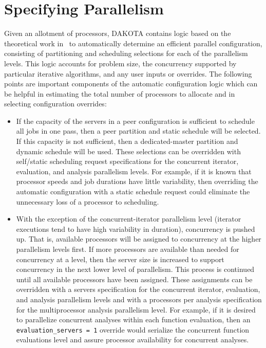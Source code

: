 \section{Specifying Parallelism}\label{parallel:spec}

Given an allotment of processors, DAKOTA contains logic based on the
theoretical work in~\cite{Eld00} to automatically determine an efficient
parallel configuration, consisting of partitioning and scheduling
selections for each of the parallelism levels. This logic accounts for
problem size, the concurrency supported by particular iterative
algorithms, and any user inputs or overrides. The following points are
important components of the automatic configuration logic which can be
helpful in estimating the total number of processors to allocate and
in selecting configuration overrides:

\begin{itemize}
\item If the capacity of the servers in a peer configuration is
  sufficient to schedule all jobs in one pass, then a peer partition
  and static schedule will be selected. If this capacity is not
  sufficient, then a dedicated-master partition and dynamic schedule
  will be used. These selections can be overridden with self/static
  scheduling request specifications for the concurrent iterator,
  evaluation, and analysis parallelism levels. For example, if it is
  known that processor speeds and job durations have little
  variability, then overriding the automatic configuration with a
  static schedule request could eliminate the unnecessary loss of a
  processor to scheduling.

\item With the exception of the concurrent-iterator parallelism level
  (iterator executions tend to have high variability in duration),
  concurrency is pushed up. That is, available processors will be
  assigned to concurrency at the higher parallelism levels first. If
  more processors are available than needed for concurrency at a
  level, then the server size is increased to support concurrency in
  the next lower level of parallelism. This process is continued until
  all available processors have been assigned. These assignments can
  be overridden with a servers specification for the concurrent
  iterator, evaluation, and analysis parallelism levels and with a
  processors per analysis specification for the multiprocessor
  analysis parallelism level. For example, if it is desired to
  parallelize concurrent analyses within each function evaluation,
  then an \texttt{evaluation\_servers = 1} override would serialize
  the concurrent function evaluations level and assure processor
  availability for concurrent analyses.
\end{itemize}

